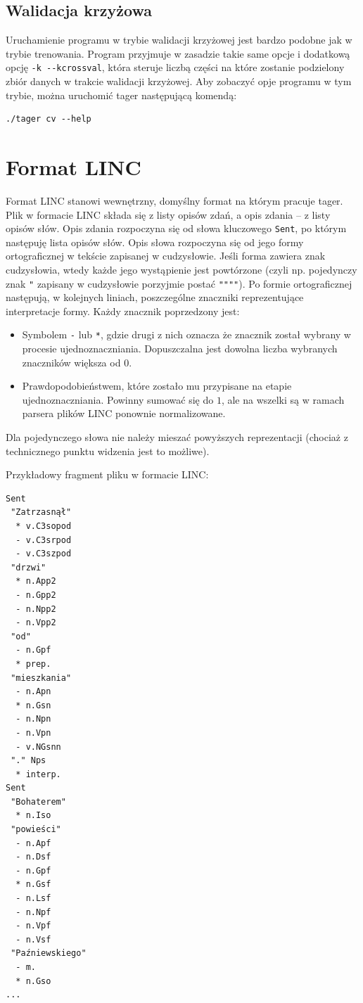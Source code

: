 \documentclass[a4paper,10]{article}
\begin{document}


\subsection{Walidacja krzyżowa}

Uruchamienie programu w trybie walidacji krzyżowej jest bardzo podobne
jak w trybie trenowania. Program przyjmuje w zasadzie takie same opcje
i dodatkową opcję \verb|-k --kcrossval|, która steruje liczbą części
na które zostanie podzielony zbiór danych w trakcie walidacji krzyżowej.
Aby zobaczyć opje programu w tym trybie, można uruchomić tager
następującą komendą:
\begin{verbatim}
./tager cv --help
\end{verbatim}

\section{Format LINC}\label{sec:linc_format}

Format LINC stanowi wewnętrzny, domyślny format na którym pracuje tager.
Plik w formacie LINC składa się z listy opisów zdań, a opis zdania --
z listy opisów słów. Opis zdania rozpoczyna się od słowa kluczowego
\verb|Sent|, po którym następuję lista opisów słów.
Opis słowa rozpoczyna się od jego formy ortograficznej w tekście
zapisanej w cudzysłowie. Jeśli forma zawiera znak cudzysłowia,
wtedy każde jego wystąpienie jest powtórzone (czyli np. pojedynczy
znak \verb|"| zapisany w cudzysłowie porzyjmie postać \verb|""""|).
Po formie ortograficznej następują, w kolejnych liniach, 
poszczególne znaczniki reprezentujące interpretacje formy. 
Każdy znacznik poprzedzony jest:
\begin{itemize}
\item Symbolem \verb|-| lub \verb|*|, gdzie drugi z nich oznacza
  że znacznik został wybrany w procesie ujednoznaczniania.
  Dopuszczalna jest dowolna liczba wybranych znaczników większa
  od $0$.
\item Prawdopodobieństwem, które zostało mu przypisane
  na etapie ujednoznaczniania. Powinny sumować się do $1$,
  ale na wszelki są w ramach parsera plików LINC ponownie
  normalizowane.
\end{itemize}
Dla pojedynczego słowa nie należy mieszać powyższych reprezentacji
(chociaż z technicznego punktu widzenia jest to możliwe).

Przykładowy fragment pliku w formacie LINC: 
\begin{verbatim}
Sent
 "Zatrzasnął"
  * v.C3sopod
  - v.C3srpod
  - v.C3szpod
 "drzwi"
  * n.App2
  - n.Gpp2
  - n.Npp2
  - n.Vpp2
 "od"
  - n.Gpf
  * prep.
 "mieszkania"
  - n.Apn
  * n.Gsn
  - n.Npn
  - n.Vpn
  - v.NGsnn
 "." Nps
  * interp.
Sent
 "Bohaterem"
  * n.Iso
 "powieści"
  - n.Apf
  - n.Dsf
  - n.Gpf
  * n.Gsf
  - n.Lsf
  - n.Npf
  - n.Vpf
  - n.Vsf
 "Paźniewskiego"
  - m.
  * n.Gso
...
\end{verbatim}
\end{document}

